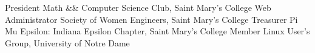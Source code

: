 \begin{cvskills}
\cvskill
  {President}
  {Math \&\& Computer Science Club, Saint Mary's College}
\cvskill
  {Web Administrator}
  {Society of Women Engineers, Saint Mary's College}
\cvskill
  {Treasurer}
  {Pi Mu Epsilon: Indiana Epsilon Chapter, Saint Mary's College}
\cvskill
  {Member}
  {Linux User's Group, University of Notre Dame}
\end{cvskills}
